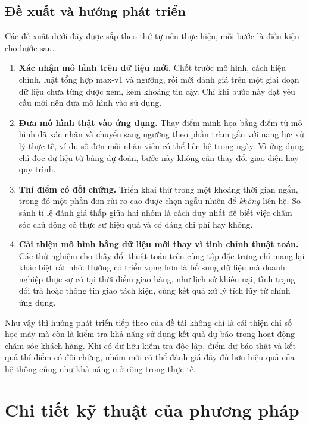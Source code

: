 \documentclass[12pt,a4paper]{report}
\begin{document}
\section{Đề xuất và hướng phát triển}\label{sec:future-work}

Các đề xuất dưới đây được sắp theo thứ tự nên thực hiện, mỗi bước là điều kiện cho bước sau.

\begin{enumerate}
  \item \textbf{Xác nhận mô hình trên dữ liệu mới.} Chốt trước mô hình, cách hiệu chỉnh, luật tổng hợp max-v1 và ngưỡng, rồi mới đánh giá trên một giai đoạn dữ liệu chưa từng được xem, kèm khoảng tin cậy. Chỉ khi bước này đạt yêu cầu mới nên đưa mô hình vào sử dụng.
  \item \textbf{Đưa mô hình thật vào ứng dụng.} Thay điểm minh họa bằng điểm từ mô hình đã xác nhận và chuyển sang ngưỡng theo phần trăm gắn với năng lực xử lý thực tế, ví dụ số đơn mỗi nhân viên có thể liên hệ trong ngày. Vì ứng dụng chỉ đọc dữ liệu từ bảng dự đoán, bước này không cần thay đổi giao diện hay quy trình.
  \item \textbf{Thí điểm có đối chứng.} Triển khai thử trong một khoảng thời gian ngắn, trong đó một phần đơn rủi ro cao được chọn ngẫu nhiên để \emph{không} liên hệ. So sánh tỉ lệ đánh giá thấp giữa hai nhóm là cách duy nhất để biết việc chăm sóc chủ động có thực sự hiệu quả và có đáng chi phí hay không.
  \item \textbf{Cải thiện mô hình bằng dữ liệu mới thay vì tinh chỉnh thuật toán.} Các thử nghiệm cho thấy đổi thuật toán trên cùng tập đặc trưng chỉ mang lại khác biệt rất nhỏ. Hướng có triển vọng hơn là bổ sung dữ liệu mà doanh nghiệp thực sự có tại thời điểm giao hàng, như lịch sử khiếu nại, tình trạng đổi trả hoặc thông tin giao tách kiện, cùng kết quả xử lý tích lũy từ chính ứng dụng.
\end{enumerate}
Như vậy thì hướng phát triển tiếp theo của đề tài không chỉ là cải thiện chỉ số học máy mà còn là kiểm tra khả năng sử dụng kết quả dự báo trong hoạt động chăm sóc khách hàng. Khi có dữ liệu kiểm tra độc lập, điểm dự báo thật và kết quả thí điểm có đối chứng, nhóm mới có thể đánh giá đầy đủ hơn hiệu quả của hệ thống cũng như khả năng mở rộng trong thực tế.
\printbibliography[heading=bibintoc,title={Tài liệu tham khảo}]
\appendix
\clearpage{}  %
\chapter{Chi tiết kỹ thuật của phương pháp}\label{app:tech}
\end{document}
